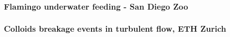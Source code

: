     \begin{frame}[label=app-2]
    \frametitle{Flamingo underwater feeding - San Diego Zoo}
    \begin{center}
    \end{center}
    \end{frame}
    
    
\begin{frame}[label=app-31]
    \frametitle{Colloids breakage events in turbulent flow, ETH Zurich}
\end{frame}
    
